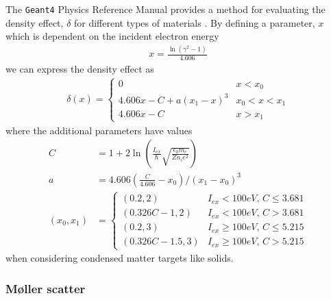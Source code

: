 \documentclass[12pt]{article}
\numberwithin{equation}{section}
\begin{document}
The \texttt{Geant4} Physics Reference Manual provides a method for evaluating the density effect, $\delta$ for different types of materials \cite{code:geant4:physRefMan}. By defining a parameter, $x$ which is dependent on the incident electron energy
%
\begin{align} \label{eq:theory:ionisation:x}
  x = \frac{\ln(\gamma^2-1)}{4.606}
\end{align}
%
we can express the density effect as 
%
\begin{align} \label{eq:theory:density_effect}
  \delta(x) =   
  \begin{cases} 
    0 &  x < x_0 \\
	4.606x - C + a(x_1 - x)^3 & x_0 < x < x_1  \\
	4.606x - C & x > x_1
  \end{cases}
\end{align}
%
where the additional parameters have values
%
\begin{align}
  C &= 1 + 2\ln\left( \frac{I_{ex}}{\hbar}\sqrt{\frac{\epsilon_0 m_e}{Zn_i e^2}} \right)\\
  a &= 4.606\left(\frac{C}{4.606} - x_0\right)/(x_1-x_0)^3\\
  (x_0, x_1) &=
  \begin{cases}
    (0.2,2) & I_{ex} < 100 eV \text{, } C \leq 3.681 \\
    (0.326C-1, 2) & I_{ex} < 100 eV \text{, } C > 3.681 \\ 
    (0.2,3) & I_{ex} \geq 100 eV \text{, } C \leq 5.215 \\
    (0.326C-1.5, 3) & I_{ex} \geq 100 eV \text{, } C > 5.215 
  \end{cases} 
\end{align}
%
when considering condensed matter targets like solids.

\subsubsection{M\o{}ller scatter} \label{sec:theory:coll:delta}
\end{document}
